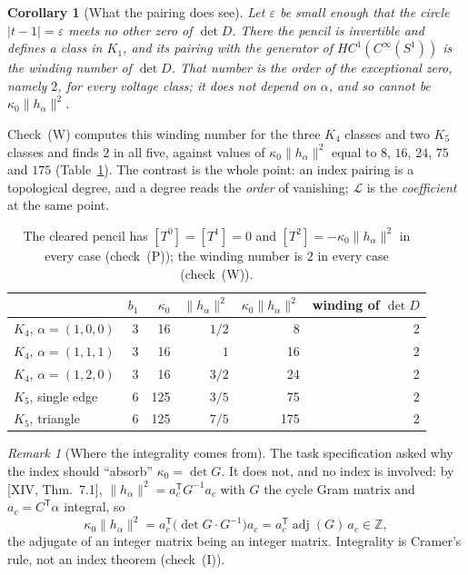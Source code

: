 \documentclass[11pt]{amsart}
\numberwithin{equation}{section}
\newtheorem{corollary}[theorem]{Corollary}
\theoremstyle{definition}
\theoremstyle{remark}
\newtheorem{remark}[theorem]{Remark}
\newcommand{\Z}{\mathbb{Z}}
\newcommand{\cL}{\mathcal{L}}
\begin{document}
\begin{corollary}[What the pairing does see]\label{cor:winding}
Let $\varepsilon$ be small enough that the circle $|t-1|=\varepsilon$ meets no other zero
of $\det D$. There the pencil is invertible and defines a class in $K_1$, and its pairing
with the generator of $HC^1(C^\infty(S^1))$ is the winding number of $\det D$. That
number is the order of the exceptional zero, namely $2$, for \emph{every} voltage class;
it does not depend on $\alpha$, and so cannot be $\kappa_0\|h_\alpha\|^2$.
\end{corollary}

Check~(W) computes this winding number for the three $K_4$ classes and two $K_5$ classes
and finds $2$ in all five, against values of $\kappa_0\|h_\alpha\|^2$ equal to $8$, $16$,
$24$, $75$ and $175$ (Table~\ref{tab:data}). The contrast is the whole point: an index
pairing is a topological degree, and a degree reads the \emph{order} of vanishing;
$\cL$ is the \emph{coefficient} at the same point.

\begin{table}[ht]
\centering\small
\begin{tabular}{lrrrrr}
\toprule
 & $b_1$ & $\kappa_0$ & $\|h_\alpha\|^2$ & $\kappa_0\|h_\alpha\|^2$ & winding of $\det D$\\
\midrule
$K_4$, $\alpha=(1,0,0)$ & 3 & 16 & $1/2$ & 8 & 2\\
$K_4$, $\alpha=(1,1,1)$ & 3 & 16 & $1$ & 16 & 2\\
$K_4$, $\alpha=(1,2,0)$ & 3 & 16 & $3/2$ & 24 & 2\\
$K_5$, single edge & 6 & 125 & $3/5$ & 75 & 2\\
$K_5$, triangle & 6 & 125 & $7/5$ & 175 & 2\\
\bottomrule
\end{tabular}
\caption{The cleared pencil has $[T^0]=[T^1]=0$ and $[T^2]=-\kappa_0\|h_\alpha\|^2$ in
every case (check~(P)); the winding number is $2$ in every case (check~(W)).}
\label{tab:data}
\end{table}

\begin{remark}[Where the integrality comes from]\label{rem:integrality}
The task specification asked why the index should ``absorb'' $\kappa_0=\det G$. It does
not, and no index is involved: by [XIV, Thm.~7.1], $\|h_\alpha\|^2=a_c^{\mathsf T}G^{-1}a_c$
with $G$ the cycle Gram matrix and $a_c=C^{\mathsf T}\alpha$ integral, so
\[
\kappa_0\|h_\alpha\|^2=a_c^{\mathsf T}\bigl(\det G\cdot G^{-1}\bigr)a_c
=a_c^{\mathsf T}\operatorname{adj}(G)\,a_c\in\Z ,
\]
the adjugate of an integer matrix being an integer matrix. Integrality is Cramer's rule,
not an index theorem (check~(I)).
\end{remark}
\end{document}
